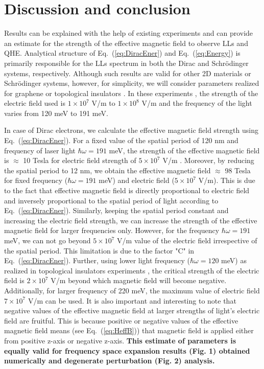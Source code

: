 \section{Discussion and conclusion}

Results can be explained with the help of existing experiments \cite{YHW, JWM} and can provide an estimate for the strength of the effective magnetic field to observe LLs and QHE. Analytical structure of Eq.~(\ref{eq:DiracEner}) and Eq.~(\ref{eq:Energy}) is primarily responsible for the LLs spectrum in both the Dirac and Schr\"{o}dinger systems, respectively.
Although such results are valid for other 2D materials or Schr\"{o}dinger systems, however, for simplicity, we will consider parameters realized for graphene or topological insulators \cite{YHW, JWM}. In these experiments \cite{YHW, JWM}, the strength of the electric field used is $1 \times 10^7$ V/m to $1 \times 10^8$ V/m and the frequency of the light varies from 120 meV to 191 meV.

In case of Dirac electrons, we calculate the effective magnetic field strength using Eq.~(\ref{eq:DiracEner}). For a fixed value of the spatial period of 120 nm and frequency of laser light $\hbar \omega = 191$ meV, the strength of the effective magnetic field is $\approx$ 10 Tesla for electric field strength of $5 \times 10^7$ V/m \cite{JWM}. Moreover, by reducing the spatial period to 12 nm, we obtain the effective magnetic field $\approx$ 98 Tesla for fixed frequency ($\hbar \omega = 191 $ meV) and electric field ($5 \times 10^7$ V/m). This is due to the fact that effective magnetic field is directly proportional to electric field and inversely proportional to the spatial period of light according to Eq.~(\ref{eq:DiracEner}). Similarly, keeping the spatial period constant and increasing the electric field strength, we can increase the strength of the effective magnetic field for larger frequencies only. However, for the frequency $\hbar \omega = 191$ meV, we can not go beyond $5 \times 10^7$ V/m value of the electric field irrespective of the spatial period. This limitation is due to the factor "C" in Eq.~(\ref{eq:DiracEner}). Further, using lower light frequency ($\hbar \omega = 120$ meV) as realized in topological insulators experiments \cite{YHW}, the critical strength of the electric field is $2 \times 10^7$ V/m beyond which magnetic field will become negative. Additionally, for larger frequency of 220 meV, the maximum value of electric field $7 \times 10^7$ V/m can be used. It is also important and interesting to note that negative values of the effective magnetic field at larger strengths of light's electric field are fruitful. This is because positive or negative values of the effective magnetic field means (see Eq.~(\ref{eq:HeffB})) that magnetic field is applied either from positive z-axis or negative z-axis. \textbf{This estimate of parameters is equally valid for frequency space expansion results (Fig. 1) obtained numerically and degenerate perturbation (Fig. 2) analysis.}

